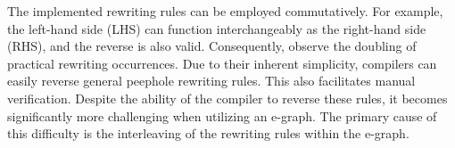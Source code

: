 The implemented rewriting rules can be employed commutatively. 
For example, the left-hand side (LHS) can function interchangeably as the right-hand side (RHS), and the reverse is also valid. 
Consequently, observe the doubling of practical rewriting occurrences. 
Due to their inherent simplicity, compilers can easily reverse general peephole rewriting rules.  
This also facilitates manual verification. 
Despite the ability of the compiler to reverse these rules, it becomes significantly more challenging when utilizing an e-graph. 
The primary cause of this difficulty is the interleaving of the rewriting rules within the e-graph.


